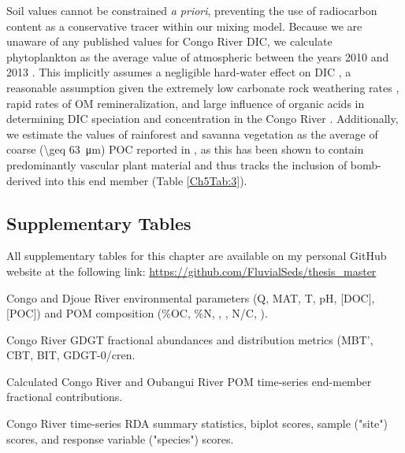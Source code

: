 Soil  values cannot be constrained \textit{a priori}, preventing the use of radiocarbon content as a conservative tracer within our mixing model. Because we are unaware of any published  values for Congo River DIC, we calculate phytoplankton  as the average value of atmospheric  between the years 2010 and 2013 \citep{Graven:2015he}. This implicitly assumes a negligible hard-water effect on DIC , a reasonable assumption given the extremely low carbonate rock weathering rates \citep[\SI{0.017}{t.C.km^{-2}.yr^{-1}};][]{Copard:2007bf}, rapid rates of OM remineralization, and large influence of organic acids in determining DIC speciation and concentration in the Congo River \citep{Wang:2013js}. Additionally, we estimate the  values of rainforest and savanna vegetation as the average of coarse (\SI{\geq 63}{\micro m}) POC reported in \citet{Spencer:2012en}, as this has been shown to contain predominantly vascular plant material and thus tracks the inclusion of bomb-derived  into this end member (Table \ref{Ch5Tab:3}).

\clearpage

\subsection{Supplementary Tables}

\renewcommand\thetable{\thechapter.S\arabic{table}}    
\setcounter{table}{0}  

\captionsetup[table]{justification=raggedright,singlelinecheck=off}

All supplementary tables for this chapter are available on my personal GitHub website at the following link: \url{https://github.com/FluvialSeds/thesis_master}

\begin{table}[h!]
	\caption[Congo and Djoue River environmental and POM measurements]{Congo and Djoue River environmental parameters (Q, MAT, T, pH, [DOC], [POC]) and POM composition (\%OC, \%N, , , N/C, ).}
	\label{Ch5Tab:S1} 
\end{table}
%
\begin{table}[h!]
	\caption[Congo River GDGT fractional abundances and metrics]{Congo River GDGT fractional abundances and distribution metrics (MBT', CBT, BIT, GDGT-0/cren.}
	\label{Ch5Tab:S2} 
\end{table}
%
\begin{table}[h!]
	\caption[End-member fractional contributions]{Calculated Congo River and Oubangui River POM time-series end-member fractional contributions.}
	\label{Ch5Tab:S3} 
\end{table}
%
\begin{table}[h!]
	\caption[RDA summary statistics and scores]{Congo River time-series RDA summary statistics, biplot scores, sample ("site") scores, and response variable ("species") scores.}
	\label{Ch5Tab:S4} 
\end{table}

